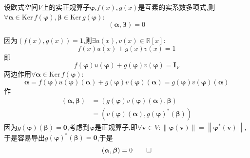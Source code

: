 \begin{green}
    \begin{lemma}[互素的延拓]\label{lem:互素的延拓}
        设欧式空间$V$上的实正规算子$\bm{\varphi}$,$f\left(x\right),g\left(x\right)$是互素的实系数多项式,则$\forall\bm{\alpha}\in\mathrm{Ker}\,f\left(\bm{\varphi}\right),\bm{\beta}\in\mathrm{Ker}\,g\left(\bm{\varphi}\right):$\[
        \left(
            \bm{\alpha},\bm{\beta}
        \right)=0
        \]
    \end{lemma}
    \begin{Proof}
        因为$\left(
            f\left(x\right),g\left(x\right)
        \right)=1$,则$\exists u\left(x\right),v\left(x\right)\in\mathbb{R}\left[x\right]:$\[
        f\left(x\right)u\left(x\right)+g\left(x\right)v\left(x\right)=1
        \]即\[
        f\left(
            \bm{\varphi}
        \right)u\left(
            \bm{\varphi}
        \right)+g\left(
            \bm{\varphi}
        \right)v\left(
            \bm{\varphi}
        \right)=\bm{I}_V
        \]两边作用$\forall\bm{\alpha}\in\mathrm{Ker}\,f\left(\bm{\varphi}\right):$\[
        \bm{\alpha}=f\left(
            \bm{\varphi}
        \right)u\left(
            \bm{\varphi}
            \right)\left(
            \bm{\alpha}
            \right)+g\left(
                \bm{\varphi}
            \right)v\left(
                \bm{\varphi}
            \right)\left(
                \bm{\alpha}
            \right)=g\left(
                \bm{\varphi}
            \right)v\left(
                \bm{\varphi}
            \right)\left(
                \bm{\alpha}
            \right)
        \]作\begin{align*}
            \left(
                \bm{\alpha},\bm{\beta}
            \right)&=\left(
                g\left(
                    \bm{\varphi}
                \right)v\left(
                    \bm{\varphi}
                \right)\left(
                    \bm{\alpha}
                \right),\bm{\beta}
            \right)\\
            &=\left(
                v\left(
                    \bm{\varphi}
                \right)\left(
                    \bm{\alpha}
                \right),g\left(
                    \bm{\varphi}
                \right)^*\left(
                    \bm{\beta}
                \right)
            \right)
        \end{align*}因为$g\left(\bm{\varphi}\right)\left(\bm{\beta}\right)=\bm{0}$,考虑到$\bm{\varphi}$是正规算子,即$\forall\bm{v}\in V:\left\lVert\bm{\varphi}\left(\bm{v}\right)\right\rVert=\left\lVert\bm{\varphi}^*\left(\bm{v}\right)\right\rVert$,于是容易导出$g\left(\bm{\varphi}\right)^*\left(\bm{\beta}\right)=\bm{0}$,于是\[
        \left(
            \bm{\alpha},\bm{\beta}
        \right)=0\qedhere
        \]
    \end{Proof}
\end{green}
